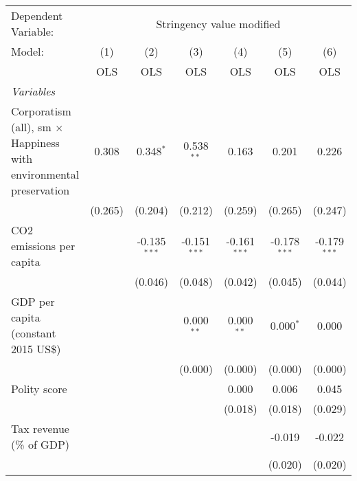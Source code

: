 
\begingroup
\centering
\begin{tabular}{lcccccc}
   \toprule
   Dependent Variable: & \multicolumn{6}{c}{Stringency value modified}\\
   Model:                                                                    & (1)     & (2)            & (3)            & (4)            & (5)            & (6)\\  
                                                                             &  OLS    & OLS            & OLS            & OLS            & OLS            & OLS\\  
   \midrule
   \emph{Variables}\\
   Corporatism (all), sm $\times$ Happiness with environmental preservation  & 0.308   & 0.348$^{*}$    & 0.538$^{**}$   & 0.163          & 0.201          & 0.226\\   
                                                                             & (0.265) & (0.204)        & (0.212)        & (0.259)        & (0.265)        & (0.247)\\   
   CO2 emissions per capita                                                  &         & -0.135$^{***}$ & -0.151$^{***}$ & -0.161$^{***}$ & -0.178$^{***}$ & -0.179$^{***}$\\   
                                                                             &         & (0.046)        & (0.048)        & (0.042)        & (0.045)        & (0.044)\\   
   GDP per capita (constant 2015 US\$)                                       &         &                & 0.000$^{**}$   & 0.000$^{**}$   & 0.000$^{*}$    & 0.000\\   
                                                                             &         &                & (0.000)        & (0.000)        & (0.000)        & (0.000)\\   
   Polity score                                                              &         &                &                & 0.000          & 0.006          & 0.045\\   
                                                                             &         &                &                & (0.018)        & (0.018)        & (0.029)\\   
   Tax revenue (\% of GDP)                                                   &         &                &                &                & -0.019         & -0.022\\   
                                                                             &         &                &                &                & (0.020)        & (0.020)\\   

\end{tabular}
